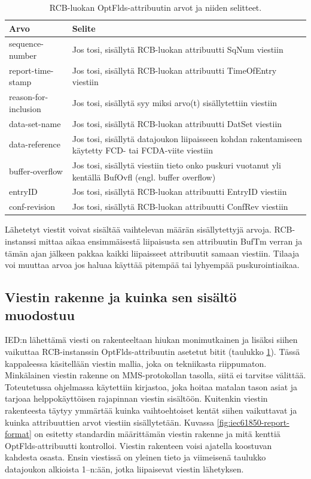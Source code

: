 \begin{table}[ht!]
	\caption{RCB-luokan OptFlds-attribuutin arvot ja niiden selitteet.}
	\label{tab:iec61850-optional-fields-definition}
	\begin{tabular}{l | l}
		\hline
		\textbf{Arvo} & \textbf{Selite} \\
		\hline \hline
		sequence-number & Jos tosi, sisällytä RCB-luokan attribuutti SqNum viestiin \\
		report-time-stamp & Jos tosi, sisällytä RCB-luokan attribuutti TimeOfEntry viestiin \\
		reason-for-inclusion & Jos tosi, sisällytä syy miksi arvo(t) sisällytettiin viestiin \\
		data-set-name & Jos tosi, sisällytä RCB-luokan attribuutti DatSet viestiin \\
		data-reference & \parbox[t]{10cm}{Jos tosi, sisällytä datajoukon liipaisseen kohdan rakentamiseen käytetty FCD- tai FCDA-viite viestiin} \\
		buffer-overflow & \parbox[t]{10cm}{Jos tosi, sisällytä viestiin tieto onko puskuri vuotanut yli kentällä BufOvfl (engl. buffer overflow)} \\
		entryID & Jos tosi, sisällytä RCB-luokan attribuutti EntryID viestiin \\
		conf-revision & Jos tosi, sisällytä RCB-luokan attribuutti ConfRev viestiin \\
		\hline
	\end{tabular}
\end{table}

Lähetetyt viestit voivat sisältää vaihtelevan määrän sisällytettyjä arvoja. RCB-instanssi mittaa aikaa ensimmäisestä liipaisusta sen attribuutin BufTm verran ja tämän ajan jälkeen pakkaa kaikki liipaisseet attribuutit samaan viestiin. Tilaaja voi muuttaa arvoa jos haluaa käyttää pitempää tai lyhyempää puskurointiaikaa.


\subsection{Viestin rakenne ja kuinka sen sisältö muodostuu}
\label{ch:viestin-rakenne}
IED:n lähettämä viesti on rakenteeltaan hiukan monimutkainen ja lisäksi siihen vaikuttaa RCB-instanssin OptFlds-attribuutin asetetut bitit (taulukko \ref{tab:iec61850-optional-fields-definition}). Tässä kappaleessa käsitellään viestin mallia, joka on tekniikasta riippumaton. Minkälainen viestin rakenne on MMS-protokollan tasolla, siitä ei tarvitse välittää. Toteutetussa ohjelmassa käytettiin kirjastoa, joka hoitaa matalan tason asiat ja tarjoaa helppokäyttöisen rajapinnan viestin sisältöön. Kuitenkin viestin rakenteesta täytyy ymmärtää kuinka vaihtoehtoiset kentät siihen vaikuttavat ja kuinka attribuuttien arvot viestiin sisällytetään. Kuvassa \ref{fig:iec61850-report-format} on esitetty standardin määrittämän viestin rakenne ja mitä kenttiä OptFlds-attribuutti kontrolloi. Viestin rakenteen voisi ajatella koostuvan kahdesta osasta. Ensin viestissä on yleinen tieto ja viimeisenä taulukko datajoukon alkioista 1--n:ään, jotka liipaisevat viestin lähetyksen.

